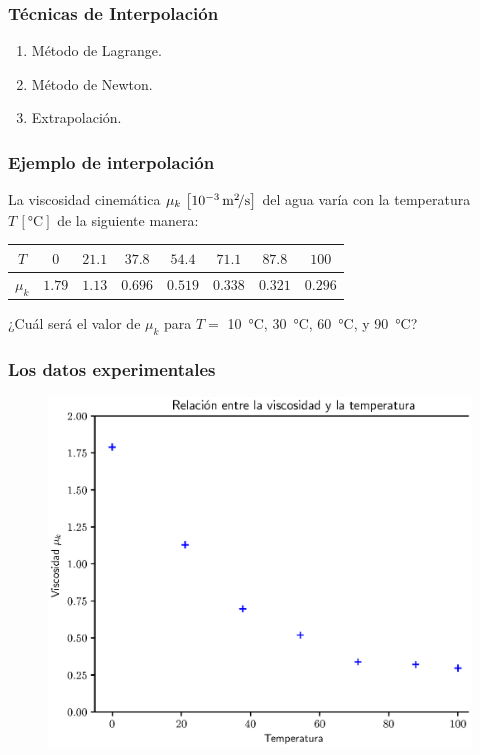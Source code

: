 \documentclass[12pt]{beamer}
\begin{document}
\begin{frame}
\frametitle{Técnicas de Interpolación}
\begin{enumerate}[<+->]
\item Método de Lagrange.
\item Método de Newton.
\item Extrapolación.
\end{enumerate}
\end{frame}
\begin{frame}
\frametitle{Ejemplo de interpolación}
La viscosidad cinemática $\mu_{k} \, \left[ \num{e-3} \, \unit[per-mode=symbol]{\square\meter\per\second}\right]$ del agua varía con la temperatura $T \, \left[ \unit{\degreeCelsius} \right]$ de la siguiente manera:
\pause
\begin{table}[H]
\centering
\begin{tabular}{c | c | c | c | c | c | c | c }
$T$ & $0$ & $21.1$ & $37.8$ & $54.4$ & $71.1$ & $87.8$ & $100$ \\ \hline
$\mu_{k}$ & $1.79$ & $1.13$ & $0.696$ & $0.519$ & $0.338$ & $0.321$ & $0.296$ 
\end{tabular}
\end{table}
\pause
¿Cuál será el valor de $\mu_{k}$ para $T = $ \SI{10}{\degreeCelsius}, \SI{30}{\degreeCelsius}, \SI{60}{\degreeCelsius}, y \SI{90}{\degreeCelsius}?
\end{frame}
\begin{frame}
\frametitle{Los datos experimentales}
\begin{figure}
    \centering
    \includegraphics[scale=0.575]{Imagenes/Intro_Interpolacion_01.eps}
\end{figure}
\end{frame}
\end{document}
